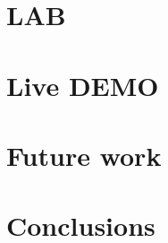 \documentclass[10pt]{beamer}
\begin{document}
\section {LAB}
\section {Live DEMO}
\section {Future work}
\section {Conclusions}



\end{document}

